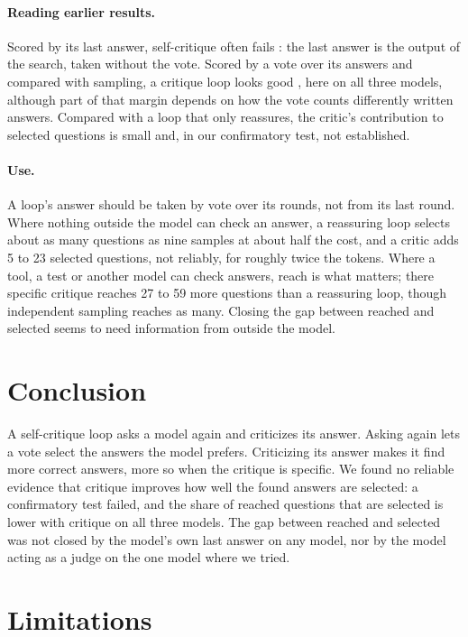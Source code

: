 \documentclass[11pt]{article}
\begin{document}
\paragraph{Reading earlier results.}
Scored by its last answer, self-critique often fails \citep{huang2024cannot,stechly2024selfverification}: the last answer is the output of the search, taken without the vote.
Scored by a vote over its answers and compared with sampling, a critique loop looks good \citep{bilal2026refining}, here on all three models, although part of that margin depends on how the vote counts differently written answers.
Compared with a loop that only reassures, the critic's contribution to selected questions is small and, in our confirmatory test, not established.

\paragraph{Use.}
A loop's answer should be taken by vote over its rounds, not from its last round.
Where nothing outside the model can check an answer, a reassuring loop selects about as many questions as nine samples at about half the cost, and a critic adds 5 to 23 selected questions, not reliably, for roughly twice the tokens.
Where a tool, a test or another model can check answers, reach is what matters; there specific critique reaches 27 to 59 more questions than a reassuring loop, though independent sampling reaches as many.
Closing the gap between reached and selected seems to need information from outside the model.

\section{Conclusion}

A self-critique loop asks a model again and criticizes its answer.
Asking again lets a vote select the answers the model prefers.
Criticizing its answer makes it find more correct answers, more so when the critique is specific.
We found no reliable evidence that critique improves how well the found answers are selected: a confirmatory test failed, and the share of reached questions that are selected is lower with critique on all three models.
The gap between reached and selected was not closed by the model's own last answer on any model, nor by the model acting as a judge on the one model where we tried.

\section*{Limitations}
\end{document}

